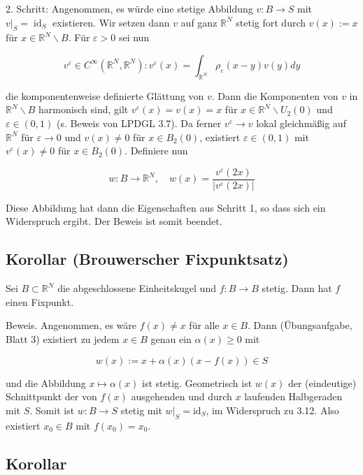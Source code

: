 \documentclass[10pt, letterpaper]{article}
\begin{document}
2. Schritt: Angenommen, es würde eine stetige Abbildung $v: B \rightarrow S$ mit $\left.v\right|_{S}=\operatorname{id}_{S}$ existieren. Wir setzen dann $v$ auf ganz $\mathbb{R}^{N}$ stetig fort durch $v(x):=x$ für $x \in \mathbb{R}^{N} \backslash B$. Für $\varepsilon>0$ sei nun

$$
v^{\varepsilon} \in C^{\infty}\left(\mathbb{R}^{N}, \mathbb{R}^{N}\right): v^{\varepsilon}(x)=\int_{\mathbb{R}^{N}} \rho_{\varepsilon}(x-y) v(y) d y
$$

die komponentenweise definierte Glättung von $v$. Dann die Komponenten von $v$ in $\mathbb{R}^{N} \backslash B$ harmonisch sind, gilt $v^{\varepsilon}(x)=v(x)=x$ für $x \in \mathbb{R}^{N} \backslash U_{2}(0)$ und $\varepsilon \in(0,1)$ (s. Beweis von LPDGL 3.7). Da ferner $v^{\varepsilon} \rightarrow v$ lokal gleichmäßig auf $\mathbb{R}^{N}$ für $\varepsilon \rightarrow 0$ und $v(x) \neq 0$ für $x \in B_{2}(0)$, existiert $\varepsilon \in(0,1)$ mit $v^{\varepsilon}(x) \neq 0$ für $x \in B_{2}(0)$. Definiere nun

$$
w: B \rightarrow \mathbb{R}^{N}, \quad w(x)=\frac{v^{\varepsilon}(2 x)}{\left|v^{\varepsilon}(2 x)\right|}
$$

Diese Abbildung hat dann die Eigenschaften aus Schritt 1, so dass sich ein Widerspruch ergibt. Der Beweis ist somit beendet.

\subsection*{Korollar (Brouwerscher Fixpunktsatz)}

Sei $B \subset \mathbb{R}^{N}$ die abgeschlossene Einheitskugel und $f: B \rightarrow B$ stetig. Dann hat $f$ einen Fixpunkt.

Beweis. Angenommen, es wäre $f(x) \neq x$ für alle $x \in B$. Dann (Übungsaufgabe, Blatt 3) existiert zu jedem $x \in B$ genau ein $\alpha(x) \geq 0$ mit

$$
w(x):=x+\alpha(x)(x-f(x)) \in S
$$

und die Abbildung $x \mapsto \alpha(x)$ ist stetig. Geometrisch ist $w(x)$ der (eindeutige) Schnittpunkt der von $f(x)$ ausgehenden und durch $x$ laufenden Halbgeraden mit $S$. Somit ist $w: B \rightarrow S$ stetig mit $\left.w\right|_{S}=\mathrm{id}_{S}$, im Widerspruch zu 3.12. Also existiert $x_{0} \in B$ mit $f\left(x_{0}\right)=x_{0}$.

\subsection*{Korollar}
\end{document}

